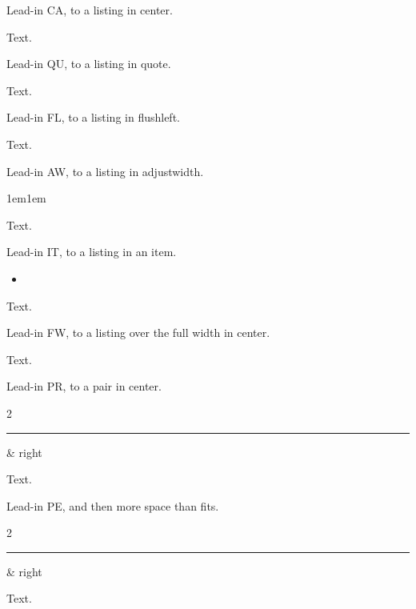 Lead-in CA, to a listing in center.\label{ca}
\begin{center}
\end{center}
Text.

Lead-in QU, to a listing in quote.\label{qu}
\begin{quote}
\end{quote}
Text.

Lead-in FL, to a listing in flushleft.\label{fl}
\begin{flushleft}
\end{flushleft}
Text.

Lead-in AW, to a listing in adjustwidth.\label{aw}
\begin{adjustwidth}{1em}{1em}
\end{adjustwidth}
Text.

Lead-in IT, to a listing in an item.\label{it}
\begin{itemize}
\item {}
\end{itemize}
Text.

Lead-in FW, to a listing over the full width in center.\label{fw}
\begin{center}
%
\end{center}
Text.

Lead-in PR, to a pair in center.\label{pr}
\begin{center}
\begin{didacticpair}{2}
  \rule{1pt}{8\baselineskip}\label{prL} & right
\end{didacticpair}
\end{center}
Text.

Lead-in PE, and then more space than fits.\label{pe}

\vspace{700pt}
\begin{didacticpair}{2}
  \rule{1pt}{8\baselineskip}\label{peL} & right
\end{didacticpair}
Text.

